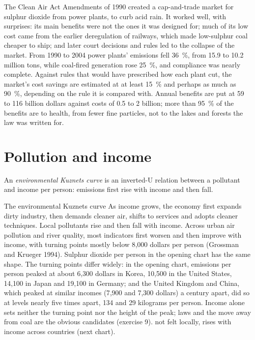 \begin{record}
The Clean Air Act Amendments of 1990 created a cap-and-trade market for sulphur dioxide from
power plants, to curb acid rain. It worked well, with surprises: its main benefits
were not the ones it was designed for; much of its low cost came from the earlier
deregulation of railways, which made low-sulphur coal cheaper to ship; and later
court decisions and rules led to the collapse of the market. %
From 1990 to 2004 power plants' emissions fell 36~\%, from 15.9 to 10.2 million tons,
while coal-fired generation rose 25~\%, and compliance was nearly complete. Against
rules that would have prescribed how each plant cut, the market's cost savings are
estimated at at least 15~\% and perhaps as much as 90~\%, depending on the rule it is
compared with. Annual benefits are put at 59 to 116 billion dollars against costs of
0.5 to 2 billion; more than 95~\% of the benefits are to health, from fewer fine
particles, not to the lakes and forests the law was written for.
\end{record}

\section{Pollution and income}\label{sec:b3:environmental-and-resource-economics:ekc}

\begin{definition}\label{def:b3:environmental-and-resource-economics:ekc}
An \emph{environmental Kuznets curve} is an inverted-U relation between a pollutant
and income per person: emissions first rise with income and then fall.
\end{definition}

\begin{model}{The environmental Kuznets curve}
\assumes As income grows, the economy first expands dirty industry, then demands
cleaner air, shifts to services and adopts cleaner techniques.
\predicts Local pollutants rise and then fall with income.
\tested Across urban air pollution and river quality, most indicators first worsen
and then improve with income, with turning points mostly below 8{,}000 dollars per person (Grossman and
Krueger 1994). %
Sulphur dioxide per person in the opening chart has the same shape.
\breaks The turning points differ widely: in the opening chart, emissions per person
peaked at about 6{,}300 dollars in Korea, 10{,}500 in the United States, 14{,}100 in Japan
and 19{,}100 in Germany; and the United Kingdom and China, which peaked at similar
incomes (7{,}900 and 7{,}300 dollars) a century apart, did so at levels nearly five times apart,
134 and 29 kilograms per person. Income alone sets neither the turning point nor the
height of the peak; laws and the move away from coal are the obvious candidates
(exercise 9). %
not felt locally, rises with income across countries (next chart).
\end{model}

